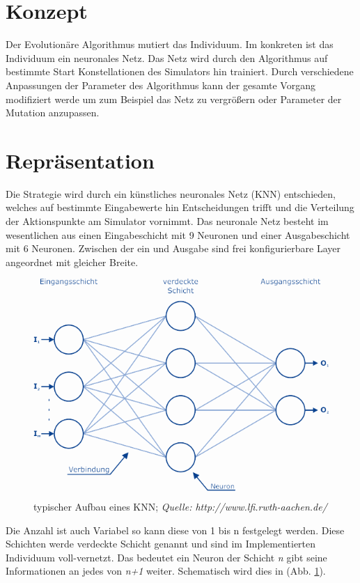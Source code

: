 \section{Konzept}
Der Evolutionäre Algorithmus mutiert das Individuum. Im konkreten ist das Individuum ein neuronales Netz. Das Netz wird durch den Algorithmus auf bestimmte Start Konstellationen des Simulators hin trainiert. Durch verschiedene Anpassungen der Parameter des Algorithmus kann der gesamte Vorgang modifiziert werde um zum Beispiel das Netz zu vergrößern oder Parameter der Mutation anzupassen.

\section{Repräsentation}
Die Strategie wird durch ein künstliches neuronales Netz (KNN) entschieden, welches auf bestimmte Eingabewerte hin Entscheidungen trifft und die Verteilung der Aktionspunkte am Simulator vornimmt. Das neuronale Netz besteht im wesentlichen aus einen Eingabeschicht mit 9 Neuronen und einer Ausgabeschicht mit 6 Neuronen. Zwischen der ein und Ausgabe sind frei konfigurierbare Layer angeordnet mit gleicher Breite. 


\begin{figure}[h!]
\begin{center}
\includegraphics[scale=1.5]{images/knn}
\caption{typischer Aufbau eines KNN;\textit{ Quelle: http://www.lfi.rwth-aachen.de/}}
\label{KNN}
\end{center}
\end{figure}

Die Anzahl ist auch Variabel so kann diese von 1 bis n festgelegt werden. Diese Schichten werde verdeckte Schicht genannt und sind im Implementierten Individuum voll-vernetzt. Das bedeutet ein Neuron der Schicht \textit{n} gibt seine Informationen an jedes von \textit{n+1} weiter. Schematisch wird dies in (Abb. \ref{KNN}).

